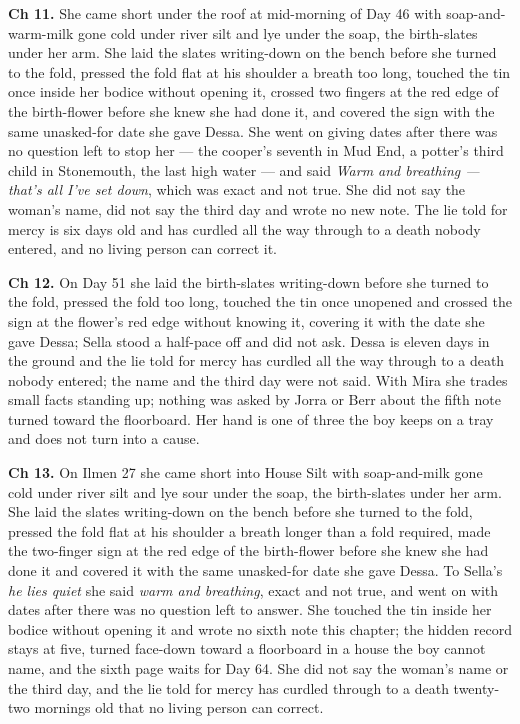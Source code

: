 \documentclass{design/chronicle}
\begin{document}
{\textbf{Ch 11.} She came short under the roof at mid-morning of Day 46 with soap-and-warm-milk gone cold under river silt and lye under the soap, the birth-slates under her arm. She laid the slates writing-down on the bench before she turned to the fold, pressed the fold flat at his shoulder a breath too long, touched the tin once inside her bodice without opening it, crossed two fingers at the red edge of the birth-flower before she knew she had done it, and covered the sign with the same unasked-for date she gave Dessa. She went on giving dates after there was no question left to stop her --- the cooper’s seventh in Mud End, a potter’s third child in Stonemouth, the last high water --- and said \emph{Warm and breathing --- that’s all I’ve set down}, which was exact and not true. She did not say the woman’s name, did not say the third day and wrote no new note. The lie told for mercy is six days old and has curdled all the way through to a death nobody entered, and no living person can correct it.

\textbf{Ch 12.} On Day 51 she laid the birth-slates writing-down before she turned to the fold, pressed the fold too long, touched the tin once unopened and crossed the sign at the flower’s red edge without knowing it, covering it with the date she gave Dessa; Sella stood a half-pace off and did not ask. Dessa is eleven days in the ground and the lie told for mercy has curdled all the way through to a death nobody entered; the name and the third day were not said. With Mira she trades small facts standing up; nothing was asked by Jorra or Berr about the fifth note turned toward the floorboard. Her hand is one of three the boy keeps on a tray and does not turn into a cause.

\textbf{Ch 13.} On Ilmen 27 she came short into House Silt with soap-and-milk gone cold under river silt and lye sour under the soap, the birth-slates under her arm. She laid the slates writing-down on the bench before she turned to the fold, pressed the fold flat at his shoulder a breath longer than a fold required, made the two-finger sign at the red edge of the birth-flower before she knew she had done it and covered it with the same unasked-for date she gave Dessa. To Sella’s \emph{he lies quiet} she said \emph{warm and breathing}, exact and not true, and went on with dates after there was no question left to answer. She touched the tin inside her bodice without opening it and wrote no sixth note this chapter; the hidden record stays at five, turned face-down toward a floorboard in a house the boy cannot name, and the sixth page waits for Day 64. She did not say the woman’s name or the third day, and the lie told for mercy has curdled through to a death twenty-two mornings old that no living person can correct.

}
\end{document}
